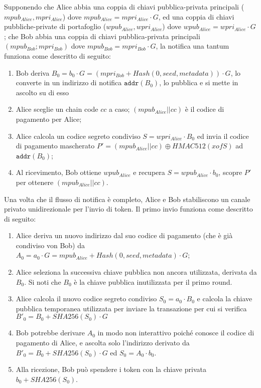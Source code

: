 Supponendo che Alice abbia una coppia di chiavi pubblica-privata principali ($mpub_{Alice}, mpri_{Alice}$) dove $mpub_{Alice} = mpri_{Alice}\cdot G$, ed una coppia di chiavi pubbliche-private di portafoglio ($wpub_{Alice}, wpri_{Alice}$) dove $wpub_{Alice} = wpri_{Alice}\cdot G$; che Bob abbia una coppia di chiavi pubblica-privata principali $(mpub_{Bob}; mpri_{Bob})$ dove $mpub_{Bob} = mpri_{Bob}\cdot G$, la notifica una tantum funziona come descritto di seguito:

\begin{enumerate}
    \item Bob deriva $B_0 = b_0\cdot G = (mpri_{Bob} + Hash(0, seed, metadata))\cdot G$, lo converte in un indirizzo di notifica $\texttt{addr}(B_0)$, lo pubblica e si mette in ascolto su di esso

    \item  Alice sceglie un chain code $cc$ a caso; $(mpub_{Alice}||cc)$ è il codice di pagamento per Alice;

    \item  Alice calcola un codice segreto condiviso $S = wpri_{Alice}\cdot B_0$ ed invia il codice di  pagamento mascherato $P' = (mpub_{Alice}||cc)\oplus HMAC512(xofS)$ ad $\texttt{addr}(B_0)$;

    \item Al ricevimento, Bob ottiene $wpub_{Alice}$ e recupera $S = wpub_{Alice}\cdot b_0$, scopre $P'$ per ottenere $(mpub_{Alice}||cc)$.
\end{enumerate}

Una volta che il flusso di notifica è completo, Alice e Bob stabiliscono un canale privato unidirezionale per l'invio di token. Il primo invio funziona come descritto di seguito:

\begin{enumerate}
    \item Alice deriva un nuovo indirizzo dal suo codice di pagamento (che è già condiviso von Bob) da $A_0 = a_0\cdot G = mpub_{Alice} + Hash(0, seed, metadata)\cdot G$;

    \item Alice seleziona la successiva chiave pubblica non ancora utilizzata, derivata da $B_0$. Si noti che $B_0$ è la chiave pubblica inutilizzata per il primo round.

   \item Alice calcola il nuovo codice segreto condiviso $S_0 = a_0\cdot B_0$ e calcola la chiave pubblica temporanea utilizzata per inviare la transazione per cui si verifica $B'_0 = B_0 + SHA256(S_0)\cdot G$

   \item Bob potrebbe derivare $A_0$ in modo non interattivo poiché conosce il codice di pagamento di Alice, e ascolta solo l'indirizzo derivato da $B'_0 = B_0 + SHA256(S_0)\cdot G$ ed $S_0 = A_0\cdot b_0$.

   \item Alla ricezione, Bob può spendere i token con la chiave privata $b_0 + SHA256(S_0)$.

\end{enumerate}


